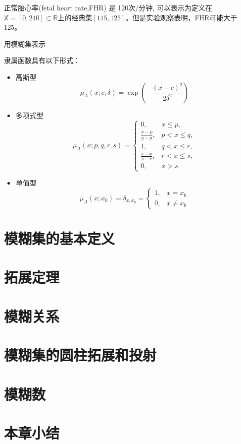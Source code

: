\begin{example}
    正常胎心率(fetal heart rate,FHR) 是 120次/分钟, 可以表示为定义在$\mathbb{X}=[0,240] \subset \mathbb{R}$上的经典集$[115,125]$。但是实验观察表明，FHR可能大于125。

    用模糊集表示

    隶属函数具有以下形式：
    \begin{itemize}
        \item 高斯型 
         \begin{equation}
            \mu_{A}(x ; c, \delta)=\exp \left(-\frac{(x-c)^{2}}{2 \delta^{2}}\right)
            \end{equation}
        \item 多项式型
        \begin{equation}
            \mu_{A}(x ; p, q, r, s)=\left\{\begin{array}{ll}
            0, & x \leq p, \\
            \frac{x-p}{q-p}, & p<x \leq q, \\
            1, & q<x \leq r, \\
            \frac{s-x}{s-r}, & r<x \leq s, \\
            0, & x>s .
            \end{array}\right.
            \end{equation}
        \item 单值型
        \begin{equation}
            \mu_{A}\left(x ; x_{0}\right)=\delta_{x, x_{0}}=\left\{\begin{array}{ll}
            1, & x=x_{0} \\
            0, & x \neq x_{0}
            \end{array}\right.
            \end{equation}  
    \end{itemize}
\end{example}
\section{模糊集的基本定义}
\section{拓展定理}
\section{模糊关系}
\section{模糊集的圆柱拓展和投射}
\section{模糊数}
\section{本章小结}